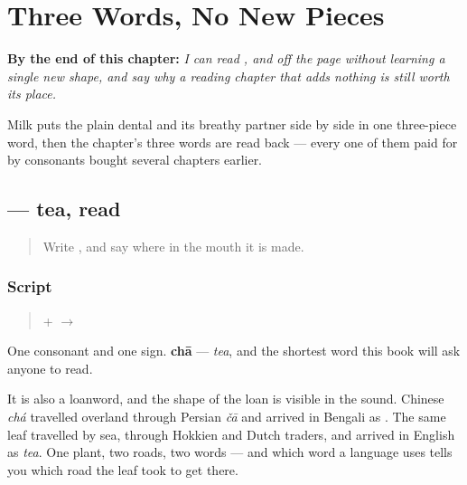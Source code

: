 
\chapter{Three Words, No New Pieces}
\label{ch:bn-three-words-no-new-pieces}

\begin{chapteropening}
\textbf{By the end of this chapter:} \emph{I can read ,  and  off the page without learning a single new shape, and say why a reading chapter that adds nothing is still worth its place.}

Milk puts the plain dental and its breathy partner side by side in one three-piece word, then the chapter's three words are read back — every one of them paid for by consonants bought several chapters earlier.
\end{chapteropening}

\section[chā]{ — tea, read}

\label{lesson:BN-W04-chaa-read}



\begin{quote}
Write \textbf{}, and say where in the mouth it is made.
\end{quote}

\subsection*{Script}
\begin{quote}
\textbf{} + \textbf{} $\to$ \textbf{}
\end{quote}

One consonant and one sign. \textbf{chā} — \emph{tea}, and the shortest word this book will ask anyone to read.

It is also a loanword, and the shape of the loan is visible in the sound. Chinese \emph{chá} travelled overland through Persian \emph{čā} and arrived in Bengali as \textbf{}. The same leaf travelled by sea, through Hokkien and Dutch traders, and arrived in English as \emph{tea}. One plant, two roads, two words — and which word a language uses tells you which road the leaf took to get there.

